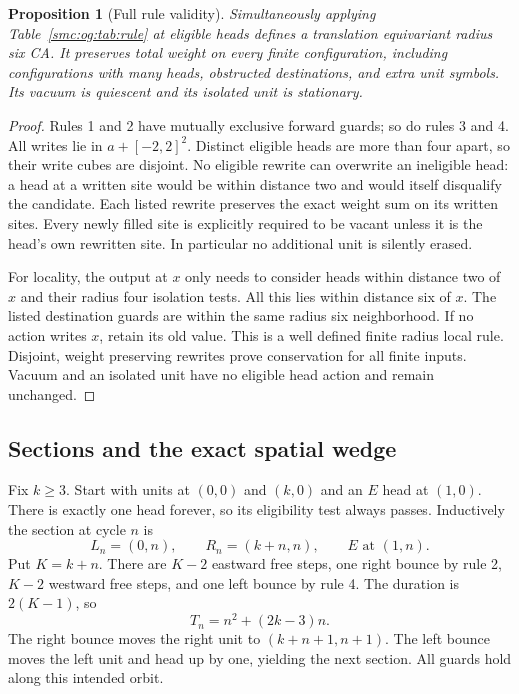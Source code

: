 \documentclass[11pt,letterpaper]{article}
\numberwithin{equation}{section}
\newtheorem{proposition}[theorem]{Proposition}
\theoremstyle{definition}
\theoremstyle{remark}
\begin{document}
\begin{proposition}[Full rule validity]\label{smc:og:prop:rule}
Simultaneously applying Table~\ref{smc:og:tab:rule} at eligible heads defines a translation equivariant radius six CA. It preserves total weight on every finite configuration, including configurations with many heads, obstructed destinations, and extra unit symbols. Its vacuum is quiescent and its isolated unit is stationary.
\end{proposition}
\begin{proof}
Rules 1 and 2 have mutually exclusive forward guards; so do rules 3 and 4. All writes lie in $a+[-2,2]^2$. Distinct eligible heads are more than four apart, so their write cubes are disjoint. No eligible rewrite can overwrite an ineligible head: a head at a written site would be within distance two and would itself disqualify the candidate. Each listed rewrite preserves the exact weight sum on its written sites. Every newly filled site is explicitly required to be vacant unless it is the head's own rewritten site. In particular no additional unit is silently erased.

For locality, the output at $x$ only needs to consider heads within distance two of $x$ and their radius four isolation tests. All this lies within distance six of $x$. The listed destination guards are within the same radius six neighborhood. If no action writes $x$, retain its old value. This is a well defined finite radius local rule. Disjoint, weight preserving rewrites prove conservation for all finite inputs. Vacuum and an isolated unit have no eligible head action and remain unchanged.
\end{proof}

\subsection{Sections and the exact spatial wedge}
Fix $k\ge3$. Start with units at $(0,0)$ and $(k,0)$ and an $E$ head at $(1,0)$. There is exactly one head forever, so its eligibility test always passes. Inductively the section at cycle $n$ is
\begin{equation}\label{smc:og:eq:wedge-section}
 L_n=(0,n),\qquad R_n=(k+n,n),\qquad E\text{ at }(1,n).
\end{equation}
Put $K=k+n$. There are $K-2$ eastward free steps, one right bounce by rule 2, $K-2$ westward free steps, and one left bounce by rule 4. The duration is $2(K-1)$, so
\begin{equation}\label{smc:og:eq:wedge-time}
 T_n=n^2+(2k-3)n.
\end{equation}
The right bounce moves the right unit to $(k+n+1,n+1)$. The left bounce moves the left unit and head up by one, yielding the next section. All guards hold along this intended orbit.
\end{document}
